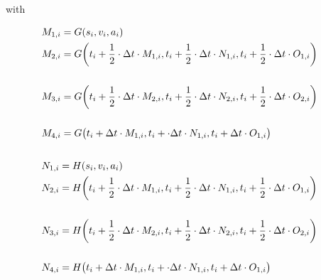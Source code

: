 with 

\begin{align}
M_{1,i} &= G(s_i, v_i, a_i) \\
M_{2,i} &\begin{multlined}[t]= G \biggl(t_i + \frac{1}{2} \cdot \Delta t \cdot M_{1,i}, t_i + \frac{1}{2} \cdot \Delta t \cdot N_{1,i}, t_i + \insertForSmartphone{\\} \frac{1}{2} \cdot \Delta t \cdot O_{1,i}\biggr) \\\end{multlined} \\
M_{3,i} &\begin{multlined}[t]= G \biggl(t_i + \frac{1}{2} \cdot \Delta t \cdot M_{2,i}, t_i + \frac{1}{2} \cdot \Delta t \cdot N_{2,i}, t_i + \insertForSmartphone{\\} \frac{1}{2} \cdot \Delta t \cdot O_{2,i}\biggr) \\ \end{multlined} \\
M_{4,i} &\begin{multlined}[t]= G \bigl(t_i +  \Delta t \cdot M_{1,i}, t_i + \cdot \Delta t \cdot N_{1,i}, t_i + \insertForSmartphone{\\} \Delta t \cdot O_{1,i}\bigr)\\ \end{multlined}
\end{align}
\begin{align}
N_{1,i} &= H(s_i, v_i, a_i) \\
N_{2,i} &\begin{multlined}[t]= H \biggl(t_i + \frac{1}{2} \cdot \Delta t \cdot M_{1,i}, t_i + \frac{1}{2} \cdot \Delta t \cdot N_{1,i}, t_i + \insertForSmartphone{\\} \frac{1}{2} \cdot \Delta t \cdot O_{1,i}\biggr)\\ \end{multlined} \\
N_{3,i} &\begin{multlined}[t]= H \biggl(t_i + \frac{1}{2} \cdot \Delta t \cdot M_{2,i}, t_i + \frac{1}{2} \cdot \Delta t \cdot N_{2,i}, t_i + \insertForSmartphone{\\} \frac{1}{2} \cdot \Delta t \cdot O_{2,i}\biggr)\\ \end{multlined} \\
N_{4,i} &\begin{multlined}[t]= H \bigl(t_i + \Delta t \cdot M_{1,i}, t_i + \cdot \Delta t \cdot N_{1,i}, t_i + \insertForSmartphone{\\} \Delta t \cdot O_{1,i}\bigr)\\ \end{multlined}
\end{align}
